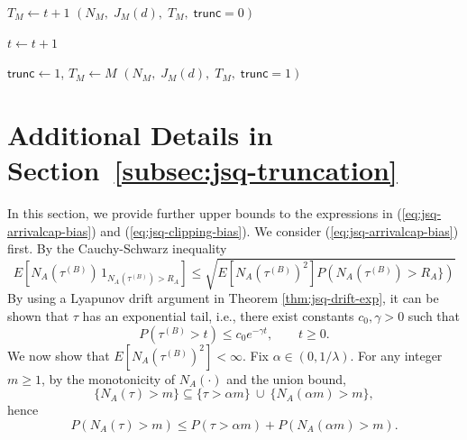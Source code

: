 \documentclass[11pt]{article}
\begin{document}
\begin{algorithm}[h]
\begin{algorithmic}[1]
        \State $T_M \gets t+1$
        \State \Return $(N_M,\;J_M(d),\;T_M,\;\mathsf{trunc}=0)$
    \EndIf

    \State $t\gets t+1$
\EndWhile

\State $\mathsf{trunc}\gets 1$, $T_M\gets M$
\State \Return $(N_M,\;J_M(d),\;T_M,\;\mathsf{trunc}=1)$
\end{algorithmic}
\end{algorithm}

\newpage
\section{Additional Details in Section~\ref{subsec:jsq-truncation}}
\label{app:approx-error-details}

In this section, we provide further upper bounds to the expressions in (\ref{eq:jsq-arrivalcap-bias}) and (\ref{eq:jsq-clipping-bias}).
We consider (\ref{eq:jsq-arrivalcap-bias}) first. By the Cauchy-Schwarz inequality
$$E\!\left[N_A(\tau^{(B)})\, 1_{N_A(\tau^{(B)})>R_A}\right]\leq
\sqrt{E\!\left[N_A(\tau^{(B)})^2\right]P(N_A(\tau^{(B)})>R_A\})}
$$
By using a Lyapunov drift argument in Theorem \ref{thm:jsq-drift-exp}, it can be shown that \(\tau\) has an
exponential tail, i.e., there exist constants \(c_0,\gamma>0\) such that
\begin{equation}
\label{eq:tau-exp-tail}
P(\tau^{(B)}>t)\le c_0 e^{-\gamma t},\qquad t\ge 0.
\end{equation}
We now show that \(E[N_A(\tau^{(B)})^2]<\infty\).
Fix \(\alpha\in(0,1/\lambda)\). For any integer \(m\ge 1\), by the monotonicity of
\(N_A(\cdot)\) and the union bound,
\begin{equation}
\label{eq:NA-union-bound}
\{N_A(\tau)>m\}
\subseteq
\{\tau>\alpha m\}\ \cup\ \{N_A(\alpha m)>m\},
\end{equation}
hence
\begin{equation}
\label{eq:NA-tail-split}
P(N_A(\tau)>m)\le P(\tau>\alpha m)+P(N_A(\alpha m)>m).
\end{equation}
\end{document}
